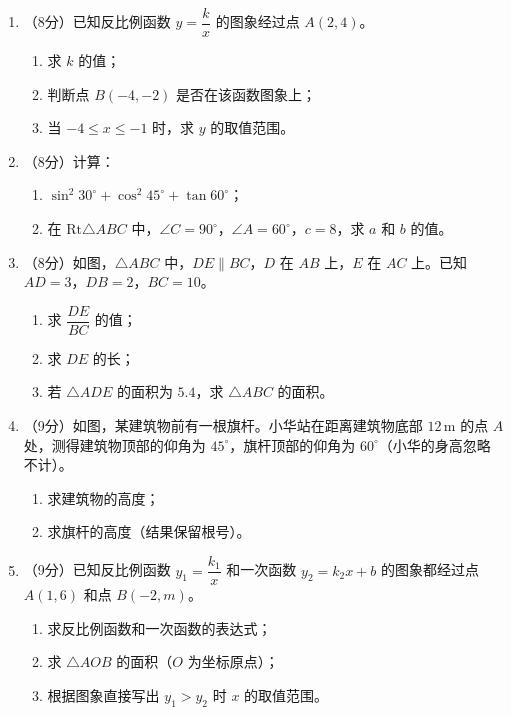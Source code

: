 \documentclass[12pt, a4paper]{ctexart}
\begin{document}
\begin{enumerate}[label=\arabic*., start=17]

\item （8分）已知反比例函数 $y = \dfrac{k}{x}$ 的图象经过点 $A(2, 4)$。
\begin{enumerate}[label=(\arabic*)]
\item 求 $k$ 的值；
\item 判断点 $B(-4, -2)$ 是否在该函数图象上；
\item 当 $-4 \leqslant x \leqslant -1$ 时，求 $y$ 的取值范围。
\end{enumerate}
\vspace{6cm}

\item （8分）计算：
\begin{enumerate}[label=(\arabic*)]
\item $\sin^2 30^\circ + \cos^2 45^\circ + \tan 60^\circ$；
\item 在 $\text{Rt}\triangle ABC$ 中，$\angle C = 90^\circ$，$\angle A = 60^\circ$，$c = 8$，求 $a$ 和 $b$ 的值。
\end{enumerate}
\vspace{6cm}

\item （8分）如图，$\triangle ABC$ 中，$DE \parallel BC$，$D$ 在 $AB$ 上，$E$ 在 $AC$ 上。已知 $AD = 3$，$DB = 2$，$BC = 10$。
\begin{enumerate}[label=(\arabic*)]
\item 求 $\dfrac{DE}{BC}$ 的值；
\item 求 $DE$ 的长；
\item 若 $\triangle ADE$ 的面积为 $5.4$，求 $\triangle ABC$ 的面积。
\end{enumerate}
\vspace{6cm}

\item （9分）如图，某建筑物前有一根旗杆。小华站在距离建筑物底部 $12\,\text{m}$ 的点 $A$ 处，测得建筑物顶部的仰角为 $45^\circ$，旗杆顶部的仰角为 $60^\circ$（小华的身高忽略不计）。
\begin{enumerate}[label=(\arabic*)]
\item 求建筑物的高度；
\item 求旗杆的高度（结果保留根号）。
\end{enumerate}
\vspace{6cm}

\item （9分）已知反比例函数 $y_1 = \dfrac{k_1}{x}$ 和一次函数 $y_2 = k_2 x + b$ 的图象都经过点 $A(1, 6)$ 和点 $B(-2, m)$。
\begin{enumerate}[label=(\arabic*)]
\item 求反比例函数和一次函数的表达式；
\item 求 $\triangle AOB$ 的面积（$O$ 为坐标原点）；
\item 根据图象直接写出 $y_1 > y_2$ 时 $x$ 的取值范围。
\end{enumerate}
\vspace{6cm}


\end{enumerate}
\end{document}

